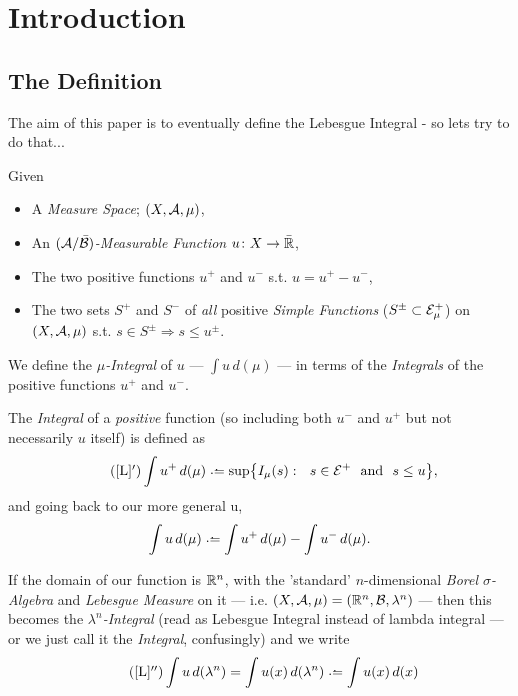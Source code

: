 \section{Introduction}
%
%
\subsection{The Definition}
The aim of this paper is to eventually define the Lebesgue Integral - so lets try to do that...
\begin{definition}
	Given
%
	\begin{itemize}
		\item A \emph{Measure Space}; $(X, \mathcal{A}, \mu)$,
		\item An $(\mathcal{A}/\bar {\mathcal{B}})$\emph{-Measurable Function} $u\colon X \rightarrow \bar {\mathbb{R}}$,
		\item The two positive functions $u^+$ and $u^-$ s.t. $u = u^+ - u^-$,
		\item The two sets $S^+$ and $S^-$ of {\em all} positive \emph{Simple Functions} ($S^{\pm} \subset \mathcal{E}_\mu^+$)
		 on $(X, \mathcal{A}, \mu)$ s.t. $s \in S^{\pm} \Rightarrow s \leq u^{\pm}$.
	\end{itemize}
%
	We define the \emph{$\mu$-Integral} of $u$ --- $\int u\,d(\mu)$ --- in terms of the \emph{Integrals}
	of the positive functions $u^+$ and $u^-$. 

	The \emph{Integral} of a {\em positive} function (so including both $u^-$ and $u^+$ but not necessarily $u$ itself) is defined as
%
	\begin{equation*}\label{posint}\tag{\ref{L}$'$}
	\int u^+\,d(\mu) \defeq \sup\bigr\{ I_\mu(s) : \ \  s \in \E^+ \hbox{ \ and \ } s \le u \bigl\},
	\end{equation*}
%
	and going back to our more general u, 
%
	\begin{equation}\label{L}
	\int u\,d(\mu) \defeq \int u^+\,d(\mu) - \int u^-\,d(\mu).
	\end{equation}

	If the domain of our function is $\mathbb{R}^n$, with the 'standard' $n$-dimensional \emph{Borel $\sigma$-Algebra} and 
	\emph{Lebesgue Measure} on it --- i.e. $(X, \mathcal{A}, \mu) = (\mathbb{R}^n, \mathcal{B}, \lambda^n)$ --- then this becomes the \emph{$\lambda^n$-Integral}
	 (read as Lebesgue Integral instead of lambda integral --- or we just call it the \emph{Integral}, confusingly) and we write
%
	\begin{equation*} \tag{\ref{L}$''$}
	\int u\,d(\lambda^n) =  \int u(x)\,d(\Ln) \defeq \int u(x)\,d(x) 
	\end{equation*}
	\vskip 5pt
\end{definition}


